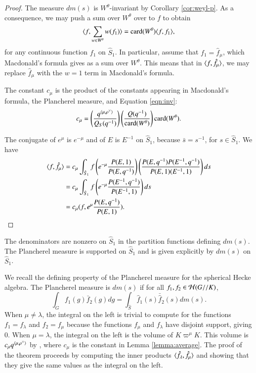 \begin{proof}  
  The measure $dm(s)$ is $W^\theta$-invariant by Corollary
  \ref{cor:weyl-p}.  As a consequence, we may push a sum over
  $W^\theta$ over to $f$ to obtain
\begin{equation}\label{eqn:inv}
\langle{f,\sum_{w\in W^\theta} w(f_1)}\rangle = {\operatorname{card}}(W^\theta)\langle{f,f_1}\rangle,
\end{equation}
for any continuous function $f_1$ on $\hat S_1$.
In particular, assume that $f_1=\hat f_\mu$, which Macdonald's
formula gives as a sum over $W^\theta$.
This means that in $\langle{f,\hat f_\mu}\rangle$, we may replace 
$\hat f_\mu$  with
the $w=1$ term  in Macdonald's formula.

The constant $c_\mu$ is the product of the constants appearing in
Macdonald's formula, the Plancherel measure, and Equation
\ref{eqn:inv}:
\[
c_\mu = \left(\frac{q^{\langle{\mu,\rho^\vee}\rangle}}{Q_S(q^{-1})}\right)
\left(\frac{Q(q^{-1})}{{\operatorname{card}}(W^\theta)}\right) {\operatorname{card}}(W^\theta).
\]

The conjugate of $e^\mu$ is $e^{-\mu}$ and of $E$ is $E^{-1}$ on $\hat
S_1$, because $\bar s = s^{-1}$, for $s\in \hat S_1$.  We have
\begin{align*}
\langle{f,\hat f_\mu}\rangle &=
c_\mu\int_{\hat S_1} f \left(e^{-\mu}
                     \frac{P(E,1)}{P(E,q^{-1})}\right) 
\left(\frac{P(E,q^{-1}) P(E^{-1},q^{-1})}{P(E,1)(E^{-1},1)}\right) ds\\
&=
c_\mu\int_{\hat S_1} f \left(e^{-\mu} 
\frac{P(E^{-1},q^{-1})}{P(E^{-1},1)}\right) ds\\
&=
c_\mu (f, e^\mu\frac{ P(E,q^{-1})}{P(E,1)}).
\end{align*}
\end{proof}

\begin{theorem}
  The denominators are nonzero on $\hat S_1$ in the partition
  functions defining $dm(s)$.  The Plancherel measure is supported on
  $\hat S_1$ and is given explicitly by $dm(s)$ on $\hat S_1$.
\end{theorem}

\begin{remark}
  We recall the defining property of the Plancherel measure for the
  spherical Hecke algebra.  The Plancherel measure is $dm(s)$ if for
  all $f_1,f_2\in \mathcal H(G//K)$,
\[
\int_G f_1(g) \bar f_2 (g) dg = \int_{\hat S} \hat f_1(s) \bar {\hat f}_2 (s) dm(s).
\]
When $\mu\ne\lambda$, the integral on the left is trivial to compute
for the functions $f_1 = f_\lambda$ and $f_2 = f_\mu$ because the
functions $f_\mu$ and $f_\lambda$ have disjoint support, giving $0$.
When $\mu=\lambda$, the integral on the left is the volume of
$K\varpi^\mu K$.  This volume is $c_\mu q^{\langle{\mu,\rho^\vee}\rangle}$ by
\cite{casselman2005companion}, where $c_\mu$ is the constant in Lemma
\ref{lemma:average}.  The proof of the theorem proceeds by computing
the inner products $\langle{\hat f_\lambda,\hat f_\mu}\rangle$ and showing that
they give the same values as the integral on the left.
\end{remark}

